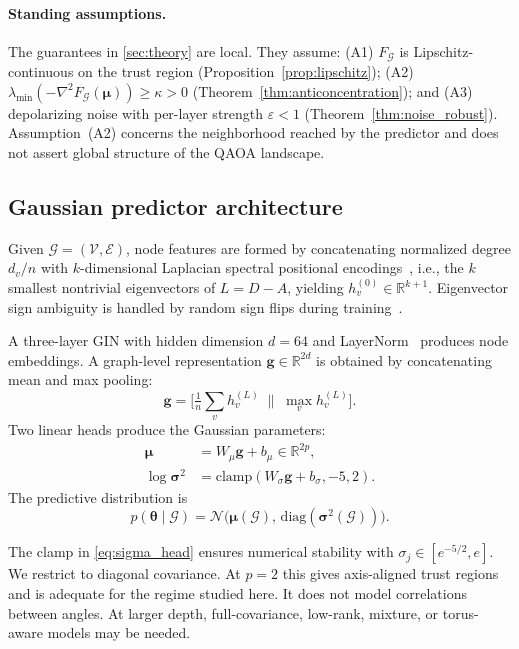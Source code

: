 \documentclass[aps,prx,reprint,superscriptaddress,longbibliography]{revtex4-2}
\newcommand{\QAOA}{\textnormal{\textsc{QAOA}}}
\newcommand{\GIN}{\textnormal{\textsc{GIN}}}
\newcommand{\Normal}{\mathcal{N}}
\newcommand{\calG}{\mathcal{G}}
\newcommand{\calV}{\mathcal{V}}
\newcommand{\calE}{\mathcal{E}}
\newcommand{\bbR}{\mathbb{R}}
\begin{document}
\paragraph{Standing assumptions.}
The guarantees in \cref{sec:theory} are local. They assume:
(A1) $F_\calG$ is Lipschitz-continuous on the trust region
(Proposition~\ref{prop:lipschitz});
(A2) $\lambda_{\min}(-\nabla^2 F_\calG(\bm\mu)) \ge \kappa > 0$
(Theorem~\ref{thm:anticoncentration}); and
(A3) depolarizing noise with per-layer strength
$\varepsilon < 1$ (Theorem~\ref{thm:noise_robust}).
Assumption~(A2) concerns the neighborhood reached by the predictor and
does not assert global structure of the \QAOA{} landscape.

\subsection{Gaussian predictor architecture}
\label{sec:architecture}

Given $\calG = (\calV,\calE)$, node features are formed by concatenating
normalized degree $d_v/n$ with $k$-dimensional Laplacian spectral
positional encodings~\cite{dwivedi2023,lim2023,kreuzer2021}, i.e., the
$k$ smallest nontrivial eigenvectors of $L = D - A$, yielding
$h_v^{(0)} \in \bbR^{k+1}$. Eigenvector sign ambiguity is handled by
random sign flips during training~\cite{lim2023}.

A three-layer \GIN{} with hidden dimension $d{=}64$ and
LayerNorm~\cite{ba2016} produces node embeddings. A graph-level
representation $\bm{g} \in \bbR^{2d}$ is obtained by concatenating mean
and max pooling:
\begin{equation}
    \bm{g} = \bigl[\tfrac{1}{n}\textstyle\sum_v h_v^{(L)} \;\big\|\;
    \max_v h_v^{(L)}\bigr].
    \label{eq:graph_repr}
\end{equation}
Two linear heads produce the Gaussian parameters:
\begin{align}
    \bm\mu &= W_\mu \bm{g} + b_\mu \in \bbR^{2p}, \label{eq:mu_head} \\
    \log\bm\sigma^2 &= \mathrm{clamp}(W_\sigma \bm{g} + b_\sigma,
    -5, 2). \label{eq:sigma_head}
\end{align}
The predictive distribution is
\begin{equation*}
    p(\bm\theta \mid \calG)
    = \Normal\bigl(\bm\mu(\calG),\,
    \mathrm{diag}(\bm\sigma^2(\calG))\bigr).
\end{equation*}

The clamp in \cref{eq:sigma_head} ensures numerical stability with
$\sigma_j \in [e^{-5/2}, e]$. We restrict to diagonal covariance. At
$p{=}2$ this gives axis-aligned trust regions and is adequate for the
regime studied here. It does not model correlations between angles.
At larger depth, full-covariance, low-rank, mixture, or torus-aware
models may be needed.
\end{document}
